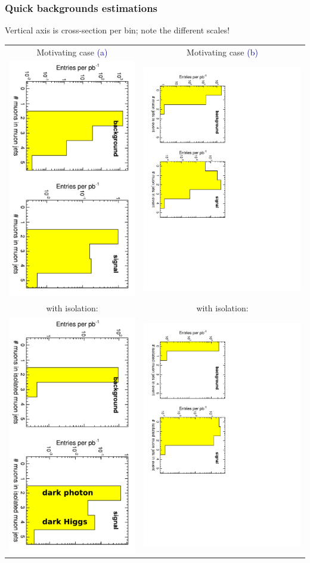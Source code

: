 \documentclass[compress]{beamer}
\begin{document}
\begin{frame}
\frametitle{Quick backgrounds estimations}

Vertical axis is cross-section per bin; note the different scales!

\vfill
\renewcommand{\arraystretch}{1.5}
\begin{tabular}{c c}
Motivating case \textcolor{darkblue}{(a)} & Motivating case \textcolor{darkblue}{(b)} \\
\includegraphics[height=0.45\linewidth, angle=90]{backgrounds_muonsperjet.pdf} & \includegraphics[height=0.45\linewidth, angle=90]{backgrounds_jetsperevent.pdf} \\
with isolation: & with isolation: \\
\includegraphics[height=0.45\linewidth, angle=90]{backgrounds_muonspergoodjet.pdf} & \includegraphics[height=0.45\linewidth, angle=90]{backgrounds_goodjetsperevent.pdf} \\

\end{tabular}
\end{frame}
\end{document}
